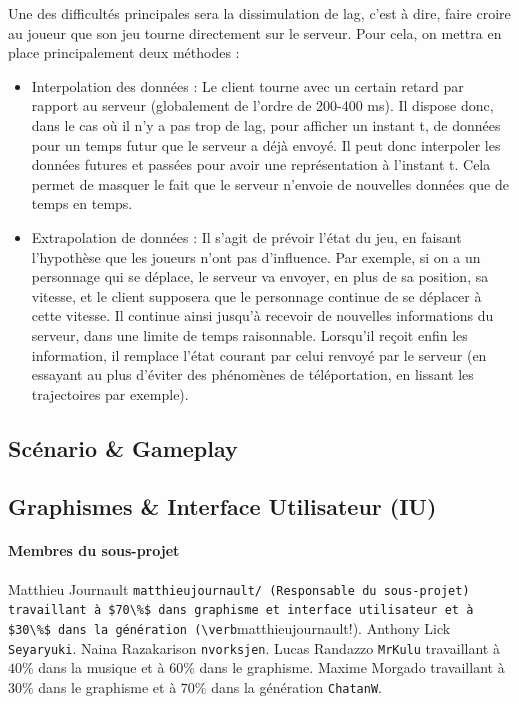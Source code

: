 \documentclass[a4paper,10pt]{article}
\begin{document}
Une des difficultés principales sera la dissimulation de lag, c'est à dire, faire croire au joueur que son jeu tourne directement sur le serveur. Pour cela, on mettra en place principalement deux méthodes :
\begin{itemize}
\item Interpolation des données : Le client tourne avec un certain retard par rapport au serveur (globalement de l'ordre de 200-400 ms). Il dispose donc, dans le cas où il n'y a pas trop de lag, pour afficher un instant t, de données pour un temps futur que le serveur a déjà envoyé. Il peut donc interpoler les données futures et passées pour avoir une représentation à l'instant t. Cela permet de masquer le fait que le serveur n'envoie de nouvelles données que de temps en temps.
\item Extrapolation de données : Il s'agit de prévoir l'état du jeu, en faisant l'hypothèse que les joueurs n'ont pas d'influence. Par exemple, si on a un personnage qui se déplace, le serveur va envoyer, en plus de sa position, sa vitesse, et le client supposera que le personnage continue de se déplacer à cette vitesse. Il continue ainsi jusqu'à recevoir de nouvelles informations du serveur, dans une limite de temps raisonnable. Lorsqu'il reçoit enfin les information, il remplace l'état courant par celui renvoyé par le serveur (en essayant au plus d'éviter des phénomènes de téléportation, en lissant les trajectoires par exemple). 
\end{itemize}


\subsection{Scénario \& Gameplay}
\subsection{Graphismes \& Interface Utilisateur (IU)}
\paragraph{Membres du sous-projet} Matthieu Journault \verb!matthieujournault/ (Responsable du sous-projet) travaillant à $70\%$ dans graphisme et interface utilisateur et à $30\%$ dans la génération (\verb!matthieujournault!). Anthony Lick \verb!Seyaryuki!. Naina Razakarison \verb!nvorksjen!. Lucas Randazzo \verb!MrKulu! travaillant à $40\%$ dans la musique et à $60\%$ dans le graphisme. Maxime Morgado travaillant à  $30\%$ dans le graphisme et à  $70\%$ dans la génération \verb!ChatanW!.
\end{document}

